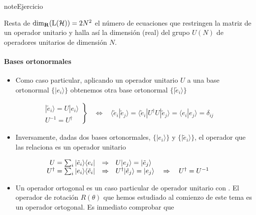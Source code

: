 \documentclass[letterpaper,10pt,english]{jupyterBook}
\newcommand{\bra}[1]{\langle #1|}
\newcommand{\ket}[1]{|#1\rangle}
\newcommand{\braket}[2]{\langle #1|#2\rangle}
\newcommand{\ketbra}[2]{| #1\rangle \langle #2 |}
\newcommand{\Hil}{{\cal H}}
\begin{document}
\begin{sphinxadmonition}{note}{Ejercicio}

\sphinxAtStartPar
Resta de  \({\rm dim}_{\bf R}({\rm L}(\Hil)) =  2N^2\) el número de ecuaciones que restringen la matriz de un operador
unitario y halla así la  dimensión (real) del grupo \(U(N)\) de  operadores unitarios de dimensión \(N\).
\end{sphinxadmonition}


\paragraph{Bases ortonormales}
\label{\detokenize{docs/Part_01_Formalismo/Chapter_01_02_Formalismo_matem_xe1tico/01_03_Operadores_myst:bases-ortonormales}}\begin{itemize}
\item {} 
\sphinxAtStartPar
Como caso particular, aplicando un operador unitario \(U\) a una base ortonormal \(\{\ket{e_i}\}\) obtenemos otra base ortonormal \(\{\ket{\tilde e_i}\}\)

\end{itemize}
\begin{equation*}
\begin{split}
\left. \begin{array}{c}\ket{\tilde e_i} = U\ket{e_i}\\ U^{-1} =  U^\dagger \end{array} \right\}
~~~~ \Longleftrightarrow ~~~~\braket{\tilde e_i}{\tilde e_j} = \bra{\tilde e_i}U^\dagger U\ket{\tilde e_j} = \braket{e_i}{e_j} = \delta_{ij}
\end{split}
\end{equation*}\begin{itemize}
\item {} 
\sphinxAtStartPar
Inversamente, dadas dos bases ortonormales, \(\{\ket{e_i}\}\) y \(\{\ket{\tilde e_i}\}\), el operador que las relaciona es un operador unitario

\end{itemize}
\begin{equation*}
\begin{split} 
 \begin{array}{rcl} 
U = \sum_i \ketbra{\tilde e_i}{e_i} & \Rightarrow &  U\ket{e_j} = \ket{\tilde e_j} 
 \\ \rule{0mm}{10mm}
U^\dagger = \sum_i \ketbra{e_i}{\tilde e_i}  & \Rightarrow &    U^\dagger\ket{\tilde e_j} = \ket{e_j} ~~~\Rightarrow ~~~U^\dagger = U^{-1}
 \end{array}
\end{split}
\end{equation*}\begin{itemize}
\item {} 
\sphinxAtStartPar
Un  operador ortogonal es un caso particular de operador  unitario con . El operador de rotación \(R(\theta)\) que hemos estudiado al comienzo de este tema es un operador ortogonal. Es inmediato comprobar que

\end{itemize}
\end{document}
